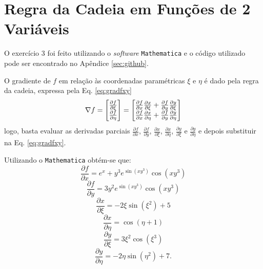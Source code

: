 \section{Regra da Cadeia em Fun\c{c}\~oes de 2 Vari\'aveis} 
O exerc\'icio 3 foi feito utilizando o \textit{software} \texttt{Mathematica} e o c\'odigo utilizado pode ser encontrado no Ap\^endice \ref{sec:github}. 

O gradiente de $f$ em rela\c{c}\~ao \`as coordenadas param\'etricas $\xi$ e $\eta$ \'e dado pela regra da cadeia, expressa pela Eq. \eqref{eq:gradfxy}
\begin{equation}
    \label{eq:gradfxy}   
    \nabla f = \begin{bmatrix}
        \frac{\partial f}{\partial \xi} \\
        \frac{\partial f}{\partial \eta}
    \end{bmatrix} = 
    \begin{bmatrix}
        \frac{\partial f}{\partial x} \frac{\partial x}{\partial \xi} + \frac{\partial f}{\partial y} \frac{\partial y}{\partial \xi} \\
        \frac{\partial f}{\partial x} \frac{\partial x}{\partial \eta} + \frac{\partial f}{\partial y} \frac{\partial y}{\partial \eta}
    \end{bmatrix}
\end{equation}
logo, basta evaluar as derivadas parciais $\frac{\partial f}{\partial x}$, $\frac{\partial f}{\partial y}$, $\frac{\partial x}{\partial \xi}$, $\frac{\partial x}{\partial \eta}$, $\frac{\partial y}{\partial \xi}$ e $\frac{\partial y}{\partial \eta}$  e depois substituir na Eq. \eqref{eq:gradfxy}.

Utilizando o \texttt{Mathematica} obt\'em-se que: 
\begin{equation*}
    \frac{\partial f}{\partial x} = e^x + y^3 e^{\sin \left(x
    y^3\right)} \cos \left(x
    y^3\right)
\end{equation*}
\begin{equation*}
    \frac{\partial f}{\partial y} = 3 y^2 e^{\sin \left(x
    y^3\right)} \cos \left(x
    y^3\right)
\end{equation*}
\begin{equation*}
    \frac{\partial x}{\partial \xi} = -2 \xi \sin \left(\xi^2\right) + 5
\end{equation*}
\begin{equation*}
    \frac{\partial x}{\partial \eta} = \cos \left(\eta + 1\right)
\end{equation*}
\begin{equation*}
    \frac{\partial y}{\partial \xi} = 3 \xi^2 \cos \left(\xi^3\right)
\end{equation*}
\begin{equation*}
    \frac{\partial y}{\partial \eta} = -2 \eta \sin \left(\eta^2\right) + 7.
\end{equation*}

